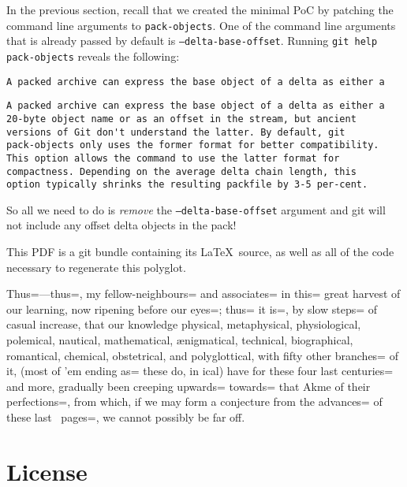 \documentclass{article}
\begin{document}
In the previous section, recall that we created the minimal PoC by
patching the command line arguments to \texttt{pack-objects}.  One of
the command line arguments that is already passed by default
is \texttt{--delta-base-offset}. Running \texttt{git help
pack-objects} reveals the following:
\begin{center}
{\footnotesize{}\hbox{\verb|A packed archive can express the base object of a delta as either a|}
\begin{minipage}{\wd9}
\begin{verbatim}
A packed archive can express the base object of a delta as either a
20-byte object name or as an offset in the stream, but ancient
versions of Git don't understand the latter. By default, git
pack-objects only uses the former format for better compatibility.
This option allows the command to use the latter format for
compactness. Depending on the average delta chain length, this
option typically shrinks the resulting packfile by 3-5 per-cent.
\end{verbatim}
\end{minipage}}
\end{center}
So all we need to do is \emph{remove} the \texttt{--delta-base-offset}
argument and git will not include any offset delta objects in the
pack!

This PDF is a git bundle containing its \LaTeX\ source, as well as all
of the code necessary to regenerate this polyglot.

{\selectfont\begin{center}
\begin{minipage}{0.8\hsize}\small
Thus=---thus=, my fellow-neighbours= and associates= in this= great harvest of our learning, now ripening before our eyes=; thus= it is=, by slow steps= of casual increase, that our knowledge physical, metaphysical, physiological, polemical, nautical, mathematical, \ae{}nigmatical, technical, biographical, romantical, chemical, obstetrical, and polyglottical, with fifty other branches= of it, (most of 'em ending as= these do, in ical) have for these four last centuries= and more, gradually been creeping upwards= towards= that Akme of their perfections=, from which, if we may form a conjecture from the advances= of these last \pgfmathresult~pages=, we cannot possibly be far off.
\end{minipage}
\end{center}}

\section{License}
\end{document}
